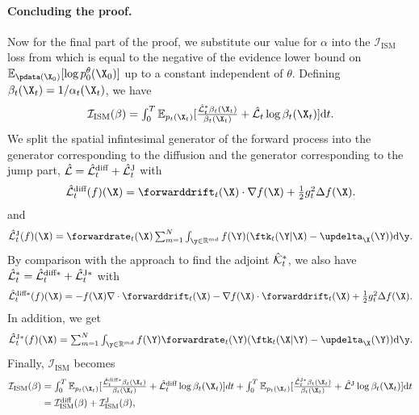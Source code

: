 \paragraph{Concluding the proof.} Now for the final part of the proof, we
substitute our value for $\alpha$ into the $\mathcal{I}_{\text{ISM}}$ loss from
\cite{benton2022denoising} which is equal to the negative of the evidence lower
bound on $\mathbb{E}_{\pdata(\X_0)} [ \log p_0^\theta(\X_0) ]$ up to
a constant independent of $\theta$. Defining
$\beta_t(\X_t) = 1 / \alpha_t(\X_t)$, we have
\begin{equation}
  \textstyle 
    \mathcal{I}_{\text{ISM}} (\beta) = \int_{0}^T \mathbb{E}_{p_t(\X_t)} [ \frac{\hat{\mathcal{L}}_t^* \beta_t(\X_t)}{\beta_t(\X_t)} + \hat{\mathcal{L}}_t \log \beta_t(\X_t) ] \rmd t . 
\end{equation}
 We split the spatial infintesimal generator of the forward process into the generator corresponding to the diffusion and the generator corresponding to the jump part, $\hat{\mathcal{L}} = \hat{\mathcal{L}}^{\text{diff}}_t + \hat{\mathcal{L}}^{\text{J}}_t$ with
 \begin{equation}
    \textstyle  \Ldiff_t(f)(\X) = \forwarddrift_t(\X) \cdot \nabla f(\X) + \frac{1}{2} g_t^2 \Delta f(\X) . 
 \end{equation}
 and 
 \begin{equation}
   \textstyle \LJ_t(f)(\X) = \forwardrate_t(\X) \inty f(\Y) ( \ftk_t(\Y | \X) - \updelta_{\X}(\Y) ) \rmd \y . 
 \end{equation}
 By comparison with the approach to find the adjoint $\hat{\mathcal{K}}^*_t$, we also have
 $\hat{\mathcal{L}}_t^* = \hat{\mathcal{L}}_t^{\text{diff}*} + \hat{\mathcal{L}}^{\text{J}* }_t$ with
 \begin{equation}
\textstyle     \hat{\mathcal{L}}_t^{\text{diff}*}(f)(\X) = -f(\X) \nabla \cdot \forwarddrift_t(\X) - \nabla f(\X) \cdot \forwarddrift_t(\X) + \frac{1}{2} g_t^2 \Delta f(\X) .
   \end{equation}
In addition, we get 
 \begin{equation}
     \textstyle \aLJ_t(f)(\X) = \inty f(\Y) \forwardrate_t(\Y) ( \ftk_t(\X | \Y) - \updelta_{\X}(\Y) ) \rmd \y .
 \end{equation}
Finally, $\mathcal{I}_{\text{ISM}}$ becomes
\begin{align}
    \mathcal{I}_{\text{ISM}} (\beta) &\textstyle = \int_{0}^T \mathbb{E}_{p_t(\X_t)} [ \frac{\hat{\mathcal{L}}_t^{\text{diff}*} \beta_t(\X_t)}{\beta_t(\X_t)} + \Ldiff_t \log \beta_t(\X_t) ] dt + 
    \int_{0}^T \mathbb{E}_{p_t(\X_t)} [ \frac{\aLJ_t \beta_t(\X_t)}{\beta_t(\X_t)} + \LJ \log \beta_t(\X_t) ] \rmd t \\
    &\textstyle = \mathcal{I}_{\text{ISM}}^{\text{diff}}(\beta) + \mathcal{I}_{\text{ISM}}^{\text{J}}(\beta) , 
\end{align}
